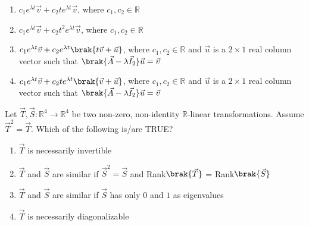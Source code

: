 \begin{enumerate}
    \item $c_1 e^{\lambda t} \vec{v} + c_2 t e^{\lambda t} \vec{v}$, where $c_1, c_2 \in \mathbb{R}$
    \item $c_1 e^{\lambda t} \vec{v} + c_2 t^2 e^{\lambda t} \vec{v}$, where $c_1, c_2 \in \mathbb{R}$
    \item $c_1 e^{\lambda t} \vec{v} + c_2 e^{\lambda t} \brak{t\vec{v} + \vec{u}}$, where $c_1, c_2 \in \mathbb{R}$ and $\vec{u}$ is a $2 \times 1$ real column vector such that $\brak{\vec{A} - \lambda \vec{I}_2}\vec{u} = \vec{v}$
    \item $c_1 e^{\lambda t} \vec{v} + c_2 t e^{\lambda t} \brak{\vec{v} + \vec{u}}$, where $c_1, c_2 \in \mathbb{R}$ and $\vec{u}$ is a $2 \times 1$ real column vector such that $\brak{\vec{A} - \lambda \vec{I}_2}\vec{u} = \vec{v}$
\end{enumerate}
\item Let $\vec{T}, \vec{S} \colon \mathbb{R}^4 \to \mathbb{R}^4$ be two non-zero, non-identity $\mathbb{R}$-linear transformations. Assume $\vec{T}^2 = \vec{T}$. Which of the following is/are TRUE? \hfill{}
\begin{enumerate}
    \item $\vec{T}$ is necessarily invertible
    \item $\vec{T}$ and $\vec{S}$ are similar if $\vec{S}^2 = \vec{S}$ and Rank$\brak{\vec{T}}$ = Rank$\brak{\vec{S}}$
    \item $\vec{T}$ and $\vec{S}$ are similar if $\vec{S}$ has only $0$ and $1$ as eigenvalues
    \item $\vec{T}$ is necessarily diagonalizable
\end{enumerate}
